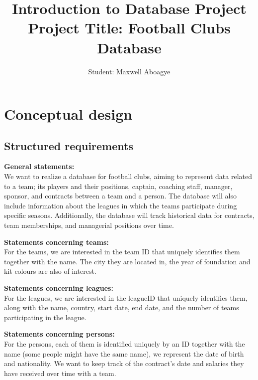 \documentclass{article}[h]
\title{\huge Introduction to Database Project\\
\vspace{6px}
\huge \textbf {Project Title: Football Clubs Database}}
\author{Student: Maxwell Aboagye}
\begin{document}
    \maketitle

    \tableofcontents

    \pagebreak

    \section{Conceptual design}\label{sec:conceptual-design}

    \subsection{Structured requirements}\label{subsec:structured-requirements}

    \setlength{\parindent}{0cm}
    \vspace{12px}
    \textbf{General statements:\\}
    We want to realize a database for football clubs, aiming to represent data related to a team; its players and their positions, captain, coaching staff, manager, sponsor, and contracts between a team and a person. The database will also include information about the leagues in which the teams participate during specific seasons. Additionally, the database will track historical data for contracts, team memberships, and managerial positions over time.

    \vspace{12px}
    \textbf{Statements concerning teams:\\}
    For the teams, we are interested in the team ID that uniquely identifies them together with the name.
    The city they are located in, the year of foundation and kit colours are also of interest.

    \vspace{12px}
    \textbf{Statements concerning leagues:\\}
    For the leagues, we are interested in the leagueID that uniquely identifies them, along with the name, country, start date, end date, and the number of teams participating in the league.

    \vspace{12px}
    \textbf{Statements concerning persons:\\}
    For the persons, each of them is identified uniquely by an ID together with the name (some people might have the same name), we represent the date of birth and nationality.
    We want to keep track of the contract's date and salaries they have received over time with a team.
\end{document}
